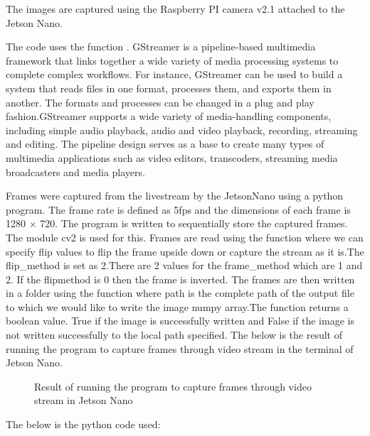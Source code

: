 The images are captured using the Raspberry PI camera v2.1 attached to the Jetson Nano.

The code uses the function . GStreamer is a pipeline-based multimedia framework that links together a wide variety of media processing systems to complete complex workflows. For instance, GStreamer can be used to build a system that reads files in one format, processes them, and exports them in another. The formats and processes can be changed in a plug and play fashion.GStreamer supports a wide variety of media-handling components, including simple audio playback, audio and video playback, recording, streaming and editing. The pipeline design serves as a base to create many types of multimedia applications such as video editors, transcoders, streaming media broadcasters and media players.

Frames were captured from the livestream by the JetsonNano using a python program. The frame rate is defined as 5fps and the dimensions of each frame is 1280 $\times$ 720. The program is written to sequentially store the captured frames. The module cv2 is used for this. Frames are read using the function   where we can specify flip values to flip the frame upside down or capture the stream as it is.The flip\_method is set as 2.There are 2 values for the frame\_method which are 1 and 2. If the flipmethod is 0 then the frame is inverted.  The frames are then written in a folder using the function where path is the complete path of the output file to which we would like to write the image numpy array.The function returns a boolean value. True if the image is successfully written and False if the image is not written successfully to the local path specified.
The below is the result of running the program to capture frames through video stream in the terminal of Jetson Nano.

\begin{figure}[H]
	\centering
	
	
	\caption{Result of running the program to capture frames through video stream in Jetson Nano}
\end{figure}  
The below is the python code used: 
\begin{code}[H]
	
	\caption{Program to capture the frames from the camera stream}\label{TensorFlow:Complete}
\end{code}

